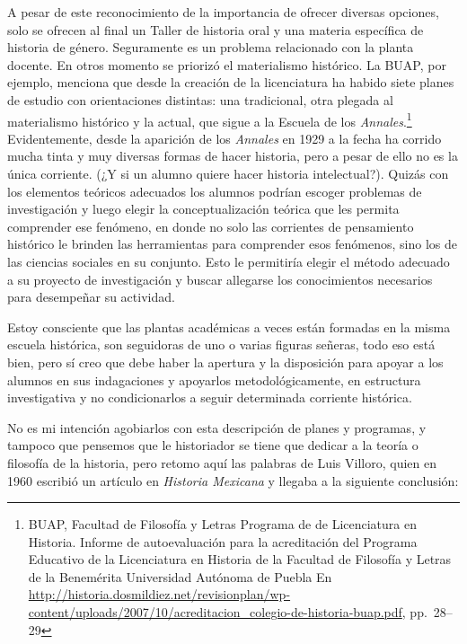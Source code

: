 A pesar de este reconocimiento de la importancia de ofrecer diversas 
opciones, solo se ofrecen al final un Taller de historia oral y una 
materia específica de historia de género. Seguramente es un problema 
relacionado con la planta docente. En otros momento se priorizó el 
materialismo histórico. La BUAP, por ejemplo, menciona que desde la 
creación de la licenciatura ha habido siete planes de estudio con 
orientaciones distintas: una tradicional, otra plegada al materialismo 
histórico y la actual, que sigue a la Escuela de los \textit{Annales}.\footnote{ 
BUAP, Facultad de Filosofía y Letras Programa de de Licenciatura en 
Historia. Informe de autoevaluación para la acreditación del Programa 
Educativo de la Licenciatura en Historia de la Facultad de Filosofía y 
Letras de la  Benemérita Universidad Autónoma de Puebla  En 
\url{http://historia.dosmildiez.net/revisionplan/wp-content/uploads/2007/10/acreditacion_colegio-de-historia-buap.pdf}, pp.~28--29} Evidentemente, desde la aparición de los \textit{Annales} en 1929 a 
la fecha ha corrido mucha tinta y muy diversas formas de hacer 
historia, pero a pesar de ello no es la única corriente. (¿Y si un 
alumno quiere hacer historia intelectual?). Quizás con los elementos 
teóricos adecuados los alumnos podrían escoger problemas de 
investigación y luego elegir la conceptualización teórica que les 
permita comprender ese fenómeno, en donde no solo las corrientes de 
pensamiento histórico le brinden las herramientas para comprender esos 
fenómenos, sino los de las ciencias sociales en su conjunto. Esto le 
permitiría elegir el método adecuado a su proyecto de investigación y 
buscar allegarse los conocimientos necesarios para desempeñar su 
actividad. 

Estoy consciente que las plantas académicas a veces están formadas en la
misma escuela histórica, son seguidoras de uno o varias figuras señeras,
todo eso está bien, pero sí creo que debe haber la apertura y la
disposición para apoyar a los alumnos en sus indagaciones y apoyarlos
metodológicamente, en estructura investigativa y no condicionarlos a seguir
determinada corriente histórica. 

No es mi intención agobiarlos con esta descripción de planes y programas, y
tampoco que pensemos que le historiador se tiene que dedicar a la teoría o
filosofía de la historia, pero retomo aquí las palabras de Luis Villoro, quien
en 1960 escribió un artículo en \textit{Historia Mexicana} y llegaba a la siguiente
conclusión: 

